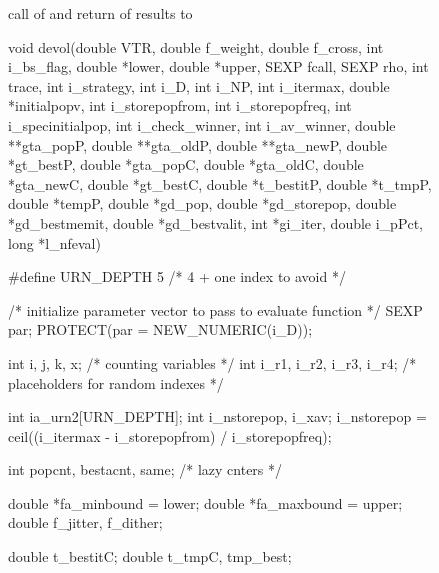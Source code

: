 \documentclass[nojss,shortnames,article]{jss}
\begin{document}
\begin{sidewaysfigure}
\begin{minipage}{0.56\linewidth}
\begin{CodeChunk}
\begin{CodeInput}
    } catch( std::exception& ex) { 
	forward_exception_to_r(ex); 
    } catch(...) { 
	::Rf_error( "c++ exception (unknown reason)"); 
    }
    return R_NilValue;
}
      \end{CodeInput}
    \end{CodeChunk}
    
    \normalsize 
  \end{minipage}
  \caption{ call of  and return of results to }
  \label{fig:deoptim_end}
\end{sidewaysfigure}



\begin{sidewaysfigure}          %
  \begin{minipage}{0.40\linewidth}
    \tiny
    \begin{CodeChunk}
      \begin{CodeInput}
void devol(double VTR, double f_weight, double f_cross, int i_bs_flag,
    double *lower, double *upper, SEXP fcall, SEXP rho, int trace, 
    int i_strategy, int i_D, int i_NP, int i_itermax,
    double *initialpopv, int i_storepopfrom, int i_storepopfreq, 
    int i_specinitialpop, int i_check_winner, int i_av_winner,
    double **gta_popP, double **gta_oldP, double **gta_newP, double *gt_bestP,
    double *gta_popC, double *gta_oldC, double *gta_newC, double *gt_bestC,
    double *t_bestitP, double *t_tmpP, double *tempP,
    double *gd_pop, double *gd_storepop, double *gd_bestmemit, double *gd_bestvalit,
    int *gi_iter, double i_pPct, long *l_nfeval)
{

#define URN_DEPTH  5   /* 4 + one index to avoid */

  /* initialize parameter vector to pass to evaluate function */
  SEXP par; PROTECT(par = NEW_NUMERIC(i_D));
  
  int i, j, k, x;  /* counting variables */
  int i_r1, i_r2, i_r3, i_r4;  /* placeholders for random indexes */

  int ia_urn2[URN_DEPTH];
  int i_nstorepop, i_xav;
  i_nstorepop = ceil((i_itermax - i_storepopfrom) / i_storepopfreq);
  
  int popcnt, bestacnt, same; /* lazy cnters */

  double *fa_minbound = lower;
  double *fa_maxbound = upper;
  double f_jitter, f_dither;
 
  double t_bestitC;
  double t_tmpC, tmp_best; 
  
}
\end{CodeInput}
\end{CodeChunk}
\end{minipage}
\end{sidewaysfigure}
\end{document}
